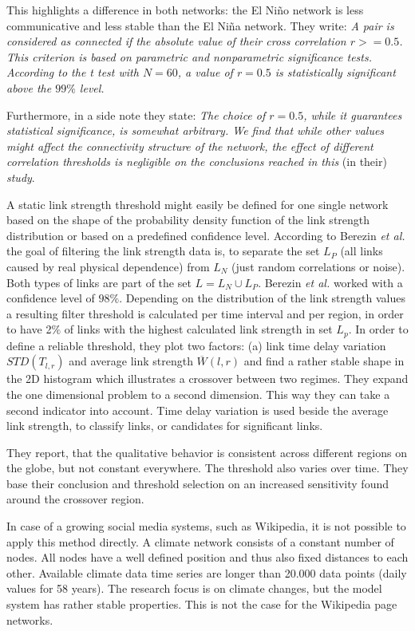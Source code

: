 \documentclass[a4paper,10pt]{scrbook}
\begin{document}
This highlights a difference in both networks: the El Ni\~no network is less communicative and less stable than the El Ni\~na network. They write: \textit{ A pair is considered as connected if the absolute
value of their cross correlation $r >= 0.5$. This criterion
is based on parametric and nonparametric significance
tests. According to the t test with $N = 60$, a value of $r =
0.5$ is statistically significant above the $99\%$ level.}

Furthermore, in a side note they state: \textit{The choice of $r = 0.5$, while it guarantees statistical significance, is somewhat arbitrary. We find that while
other values might affect the connectivity structure of the
network, the effect of different correlation thresholds is
negligible on the conclusions reached in this} (in their) \textit{study}.

A static link strength threshold might easily be defined for one single network based on the shape of the probability density function of the link strength distribution or based on a predefined confidence level. According to Berezin \textit{et al.} \cite{Berezin2011} the goal of filtering the link strength data is, to separate the set $L_P$ (all links caused by real physical dependence) from $L_N$ (just random correlations or noise). Both types of links are part of the set $L = L_N \cup  L_P $. Berezin \textit{et al.} worked with a confidence level of $98\%$. Depending on the distribution of the link strength values a resulting filter threshold is calculated per time interval and per region, in order to have 2$\%$ of links with the highest calculated link strength in set $L_p$. In order to define a reliable threshold, they plot two factors: (a) link time delay variation $STD(T_{l,r})$ and average link strength $\overline{W}(l,r)$ and find a rather stable shape in the 2D histogram which illustrates a crossover between two regimes. They expand the one dimensional problem to a second dimension. This way they can take a second indicator into account. Time delay variation is used beside the average link strength, to classify links, or candidates for significant links.

They report, that the qualitative behavior is consistent across different regions on the globe, but not constant everywhere. The threshold also varies over time. They base their conclusion and threshold selection on an increased sensitivity found around the crossover region.

In case of a growing social media systems, such as Wikipedia, it is not possible to apply this method directly. A climate network consists of a constant number of nodes. All nodes have a well defined position and thus also fixed distances to each other. Available climate data time series are longer than 20.000 data points (daily values for 58 years). The research focus is on climate changes, but the model system has rather stable properties. This is not the case for the Wikipedia page networks.
\end{document}
